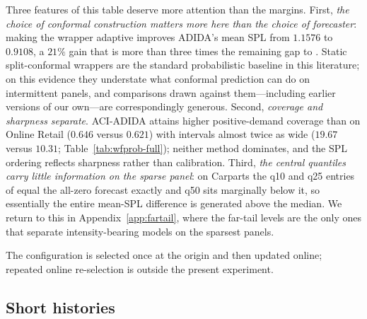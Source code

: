 Three features of this table deserve more attention than the margins.
First, \emph{the choice of conformal construction matters more here than
the choice of forecaster}: making the wrapper adaptive
\citep{gibbs2021} improves ADIDA's mean SPL from $1.1576$ to $0.9108$, a
$21\%$ gain that is more than three times the remaining gap to \EBB{}.
Static split-conformal wrappers are the standard probabilistic baseline in
this literature; on this evidence they understate what conformal
prediction can do on intermittent panels, and comparisons drawn against
them---including earlier versions of our own---are correspondingly
generous. Second, \emph{coverage and sharpness separate}. ACI-ADIDA
attains higher positive-demand coverage than \EBB{} on Online Retail
($0.646$ versus $0.621$) with intervals almost twice as wide ($19.67$
versus $10.31$; Table~\ref{tab:wfprob-full}); neither method
dominates, and the SPL ordering reflects sharpness rather than
calibration. Third, \emph{the central quantiles carry little information
on the sparse panel}: on Carparts the q10 and q25 entries of \EBB{}
equal the all-zero forecast exactly and q50 sits marginally below it, so
essentially the entire mean-SPL difference is generated above the median.
We return to this in Appendix~\ref{app:fartail}, where the far-tail
levels are the only ones that separate intensity-bearing models on the
sparsest panels.

The configuration is selected once at the origin and then updated online;
repeated online re-selection is outside the present experiment.

\subsection{Short histories}\label{sec:coldstart}

